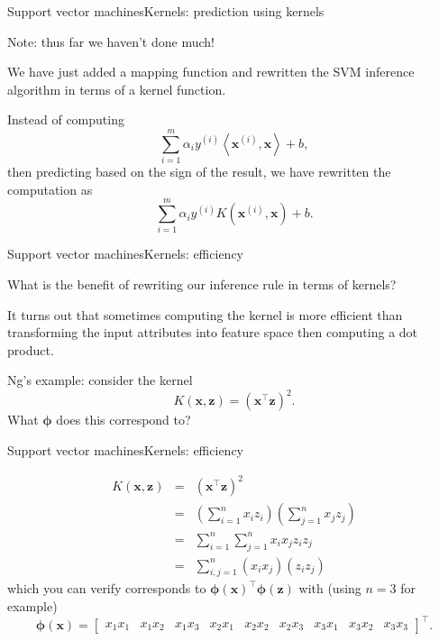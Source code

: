 \documentclass{beamer}
\renewcommand{\vec}[1]{\boldsymbol{#1}}
\begin{document}
\begin{frame}{Support vector machines}{Kernels: prediction using kernels}

  Note: thus far we haven't done much!

  \medskip

  We have just added a mapping function and rewritten the SVM inference
  algorithm in terms of a kernel function.

  \medskip

  Instead of computing
  \[ \sum_{i=1}^m\alpha_i y^{(i)}\left< \vec{x}^{(i)}, \vec{x}\right> + b ,\]
  then predicting based on the sign of the result, we have rewritten the
  computation as
  \[ \sum_{i=1}^m\alpha_i y^{(i)} K(\vec{x}^{(i)}, \vec{x}) + b .\]
  
\end{frame}


\begin{frame}{Support vector machines}{Kernels: efficiency}

  What is the benefit of rewriting our inference rule in terms of kernels?

  \medskip

  It turns out that sometimes computing the kernel is \alert{more
    efficient} than transforming the input attributes into feature
  space then computing a dot product.

  \medskip

  Ng's example: consider the kernel
  \[ K(\vec{x},\vec{z}) = (\vec{x}^\top\vec{z})^2. \]
  What $\vec{\phi}$ does this correspond to?

\end{frame}


\begin{frame}{Support vector machines}{Kernels: efficiency}

  \begin{eqnarray}
    K(\vec{x},\vec{z}) & = & (\vec{x}^\top\vec{z})^2 \nonumber \\
    & = & \left( \sum_{i=1}^n x_iz_i \right)
    \left( \sum_{j=1}^n x_j z_j \right) \nonumber \\
    & = & \sum_{i=1}^n\sum_{j=1}^n x_i x_j z_i z_j \nonumber \\
    & = & \sum_{i,j=1}^n (x_i x_j)(z_i z_j) \nonumber
  \end{eqnarray}
  which you can verify corresponds to
  $\vec{\phi}(\vec{x})^\top\vec{\phi}(\vec{z})$ with (using $n=3$ for example)
  \[ \vec{\phi}(\vec{x}) = \begin{bmatrix} x_1x_1 & x_1x_2 & x_1x_3 & x_2x_1 & x_2x_2 & x_2x_3 & x_3x_1 & x_3x_2 & x_3x_3 \end{bmatrix}^\top .\]
      
\end{frame}
\end{document}
